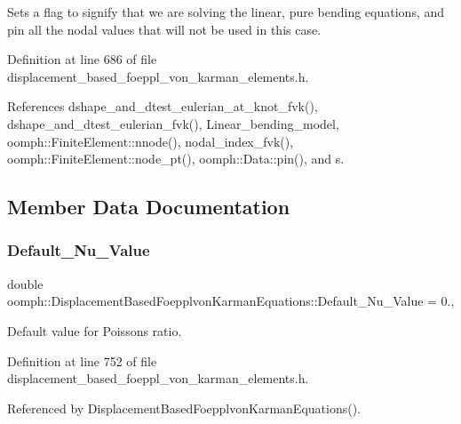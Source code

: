Sets a flag to signify that we are solving the linear, pure bending equations, and pin all the nodal values that will not be used in this case. 



Definition at line 686 of file displacement\+\_\+based\+\_\+foeppl\+\_\+von\+\_\+karman\+\_\+elements.\+h.



References dshape\+\_\+and\+\_\+dtest\+\_\+eulerian\+\_\+at\+\_\+knot\+\_\+fvk(), dshape\+\_\+and\+\_\+dtest\+\_\+eulerian\+\_\+fvk(), Linear\+\_\+bending\+\_\+model, oomph\+::\+Finite\+Element\+::nnode(), nodal\+\_\+index\+\_\+fvk(), oomph\+::\+Finite\+Element\+::node\+\_\+pt(), oomph\+::\+Data\+::pin(), and s.



\subsection{Member Data Documentation}
\mbox{\label{classoomph_1_1DisplacementBasedFoepplvonKarmanEquations_adf6cf725968deb5c555c1276cc51d83a}} 
\subsubsection{\texorpdfstring{Default\+\_\+\+Nu\+\_\+\+Value}{Default\_Nu\_Value}}
{\footnotesize\ttfamily double oomph\+::\+Displacement\+Based\+Foepplvon\+Karman\+Equations\+::\+Default\+\_\+\+Nu\+\_\+\+Value = 0.\hspace{0.3cm}{\ttfamily [static]}, {\ttfamily [private]}}



Default value for Poisson\textquotesingle{}s ratio. 



Definition at line 752 of file displacement\+\_\+based\+\_\+foeppl\+\_\+von\+\_\+karman\+\_\+elements.\+h.



Referenced by Displacement\+Based\+Foepplvon\+Karman\+Equations().

